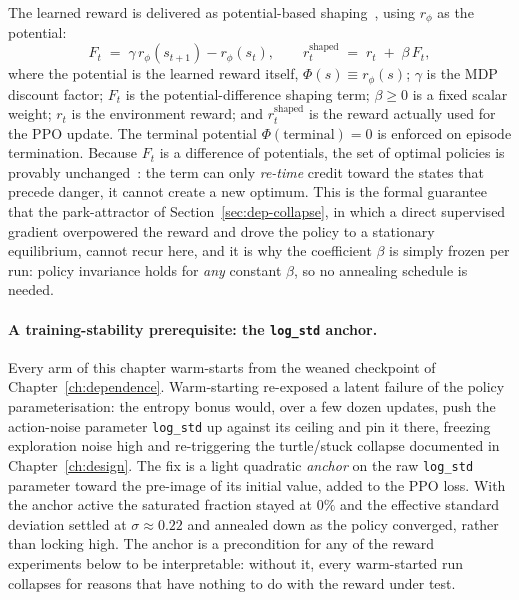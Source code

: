 The learned reward is delivered as potential-based shaping~\cite{ng1999shaping}, using \(r_\phi\)
as the potential:
\begin{equation}\label{eq:potential}
  F_t \;=\; \gamma\,r_\phi(s_{t+1}) - r_\phi(s_t),
  \qquad
  r^{\mathrm{shaped}}_t \;=\; r_t \;+\; \beta\,F_t ,
\end{equation}
where the potential is the learned reward itself, \(\Phi(s)\equiv r_\phi(s)\); \(\gamma\) is the
MDP discount factor; \(F_t\) is the potential-difference shaping term; \(\beta\ge0\) is a fixed
scalar weight; \(r_t\) is the environment reward; and \(r^{\mathrm{shaped}}_t\) is the reward
actually used for the PPO update. The terminal potential \(\Phi(\text{terminal})=0\) is enforced
on episode termination. Because \(F_t\) is a difference of potentials, the set of optimal
policies is provably unchanged~\cite{ng1999shaping}: the term can only \emph{re-time} credit
toward the states that precede danger, it cannot create a new optimum. This is the formal
guarantee that the park-attractor of Section~\ref{sec:dep-collapse}, in which a direct supervised
gradient overpowered the reward and drove the policy to a stationary equilibrium, cannot recur
here, and it is why the coefficient \(\beta\) is simply frozen per run: policy invariance holds
for \emph{any} constant \(\beta\), so no annealing schedule is needed.

\paragraph{A training-stability prerequisite: the \texttt{log\_std} anchor.} Every arm of this
chapter warm-starts from the weaned checkpoint of Chapter~\ref{ch:dependence}. Warm-starting
re-exposed a latent failure of the policy parameterisation: the entropy bonus would, over a few
dozen updates, push the action-noise parameter \texttt{log\_std} up against its ceiling and pin
it there, freezing exploration noise high and re-triggering the turtle/stuck collapse documented
in Chapter~\ref{ch:design}. The fix is a light quadratic \emph{anchor} on the raw
\texttt{log\_std} parameter toward the pre-image of its initial value, added to the PPO loss.
With the anchor active the saturated fraction stayed at \(0\%\) and the effective standard
deviation settled at \(\sigma\approx0.22\) and annealed down as the policy converged, rather than
locking high. The anchor is a precondition for any of the reward experiments below to be
interpretable: without it, every warm-started run collapses for reasons that have nothing to do
with the reward under test.

